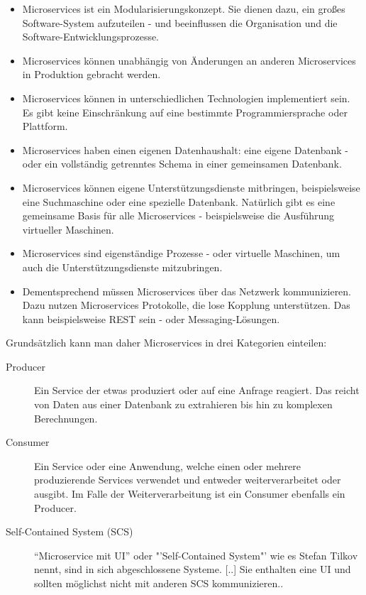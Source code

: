 \begin{itemize}
    \item Microservices ist ein Modularisierungskonzept. Sie dienen dazu, ein großes Software-System aufzuteilen - und beeinflussen die Organisation und die Software-Entwicklungsprozesse.
    \item Microservices können unabhängig von Änderungen an anderen Microservices in Produktion gebracht werden.
    \item Microservices können in unterschiedlichen Technologien implementiert sein. Es gibt keine Einschränkung auf eine bestimmte Programmiersprache oder Plattform.
    \item Microservices haben einen eigenen Datenhaushalt: eine eigene Datenbank - oder ein vollständig getrenntes Schema in einer gemeinsamen Datenbank.
    \item Microservices können eigene Unterstützungsdienste mitbringen, beispielsweise eine Suchmaschine oder eine spezielle Datenbank. Natürlich gibt es eine gemeinsame Basis für alle Microservices - beispielsweise die Ausführung virtueller Maschinen.
    \item Microservices sind eigenständige Prozesse - oder virtuelle Maschinen, um auch die Unterstützungsdienste mitzubringen.
    \item Dementsprechend müssen Microservices über das Netzwerk kommunizieren. Dazu nutzen Microservices Protokolle, die lose Kopplung unterstützen. Das kann beispielsweise REST sein - oder Messaging-Lösungen.
\end{itemize}

Grundsätzlich kann man daher Microservices in drei Kategorien einteilen:
\begin{description}
    \item[Producer] Ein Service der etwas produziert oder auf eine Anfrage reagiert. Das reicht von Daten aus einer Datenbank zu extrahieren bis hin zu komplexen Berechnungen.
    \item[Consumer] Ein Service oder eine Anwendung, welche einen oder mehrere produzierende Services verwendet und entweder weiterverarbeitet oder ausgibt. Im Falle der Weiterverarbeitung ist ein Consumer ebenfalls ein Producer.
    \item[Self-Contained System (SCS)] \frqq "`Microservice mit UI"' oder "'Self-Contained System"' wie es Stefan Tilkov nennt, sind in sich abgeschlossene Systeme. [..] Sie enthalten eine UI und sollten möglichst nicht mit anderen SCS kommunizieren.\flqq \cite[vgl S. 55]{EWolff2016:Microservices}.
\end{description}

